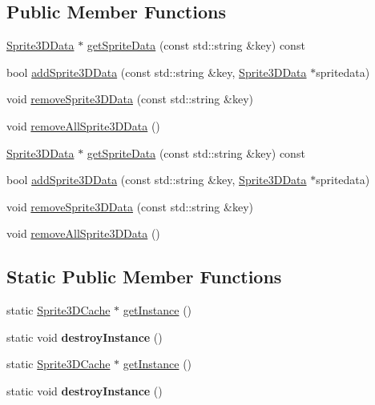 \subsection*{Public Member Functions}
\begin{DoxyCompactItemize}
\item 
\hyperlink{structSprite3DCache_1_1Sprite3DData}{Sprite3\+D\+Data} $\ast$ \hyperlink{classSprite3DCache_a9ca39b86b1d20d96f7c37ae6627e0d87}{get\+Sprite\+Data} (const std\+::string \&key) const
\item 
bool \hyperlink{classSprite3DCache_a8347de6c622a257f92a286f21a1774bf}{add\+Sprite3\+D\+Data} (const std\+::string \&key, \hyperlink{structSprite3DCache_1_1Sprite3DData}{Sprite3\+D\+Data} $\ast$spritedata)
\item 
void \hyperlink{classSprite3DCache_afac35769b8587bc50efe723463e7082c}{remove\+Sprite3\+D\+Data} (const std\+::string \&key)
\item 
void \hyperlink{classSprite3DCache_a0281a59eee1cd1897705855a1409260d}{remove\+All\+Sprite3\+D\+Data} ()
\item 
\hyperlink{structSprite3DCache_1_1Sprite3DData}{Sprite3\+D\+Data} $\ast$ \hyperlink{classSprite3DCache_a9f2648cc6646cbeffb106ecc6234edcb}{get\+Sprite\+Data} (const std\+::string \&key) const
\item 
bool \hyperlink{classSprite3DCache_a8347de6c622a257f92a286f21a1774bf}{add\+Sprite3\+D\+Data} (const std\+::string \&key, \hyperlink{structSprite3DCache_1_1Sprite3DData}{Sprite3\+D\+Data} $\ast$spritedata)
\item 
void \hyperlink{classSprite3DCache_afac35769b8587bc50efe723463e7082c}{remove\+Sprite3\+D\+Data} (const std\+::string \&key)
\item 
void \hyperlink{classSprite3DCache_a0281a59eee1cd1897705855a1409260d}{remove\+All\+Sprite3\+D\+Data} ()
\end{DoxyCompactItemize}
\subsection*{Static Public Member Functions}
\begin{DoxyCompactItemize}
\item 
static \hyperlink{classSprite3DCache}{Sprite3\+D\+Cache} $\ast$ \hyperlink{classSprite3DCache_abded39f123736a9dd38eda5b8e5d5424}{get\+Instance} ()
\item 
\mbox{\label{classSprite3DCache_a7b0eb2fcc34df7d4cfbe6e3dcb1bdd33}} 
static void {\bfseries destroy\+Instance} ()
\item 
static \hyperlink{classSprite3DCache}{Sprite3\+D\+Cache} $\ast$ \hyperlink{classSprite3DCache_af5483cbe2447db7046d5adfed594e67b}{get\+Instance} ()
\item 
\mbox{\label{classSprite3DCache_a7a50b00e9548670614658e90450960fd}} 
static void {\bfseries destroy\+Instance} ()
\end{DoxyCompactItemize}
